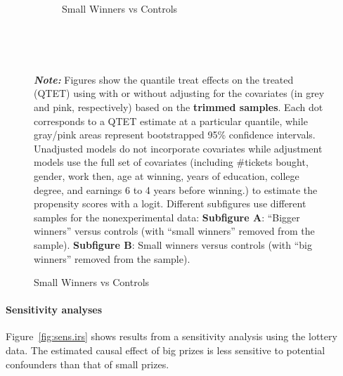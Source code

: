 \documentclass[letterpaper,12pt,leqno]{article}
\begin{document}
\begin{figure}[!ht]
\begin{minipage}[c]{1\textwidth}
\begin{subfigure}{1\linewidth}
            \caption{Small Winners vs Controls}
        \end{subfigure}\\        
    \end{minipage}%
    \\\raggedright
     {\footnotesize\textbf{\textit{Note:}} Figures show the quantile treat effects on the treated (QTET) using with or without adjusting for the covariates (in grey and pink, respectively) based on the \textbf{trimmed samples}. Each dot corresponds to a QTET estimate at a particular quantile, while gray/pink areas represent bootstrapped 95\% confidence intervals. Unadjusted models do not incorporate covariates while adjustment models use the full set of covariates (including \#tickets bought, gender, work then, age at winning, years of education, college degree, and earnings 6 to 4 years before winning.) to estimate the propensity scores with a logit. Different subfigures use different samples for the nonexperimental data: \textbf{Subfigure A}: ``Bigger winners'' versus controls (with ``small winners'' removed from the sample). \textbf{Subfigure B}: Small winners versus controls (with ``big winners'' removed from the sample).}
\end{figure}

\clearpage

\paragraph{Sensitivity analyses} Figure~\ref{fig:sens.irs} shows results from a sensitivity analysis using the lottery data. The estimated causal effect of big prizes is less sensitive to potential confounders than that of small prizes. 
\end{document}

